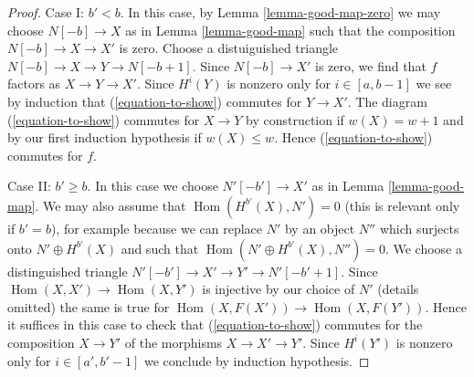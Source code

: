 \documentclass[10pt,a4paper]{amsart}
\theoremstyle{plain}
\theoremstyle{definition}
\theoremstyle{remark}
\numberwithin{equation}{subsection}
\def\Hom{\mathop{\mathrm{Hom}}\nolimits}
\begin{document}
\begin{proof}
\medskip\noindent
Case I: $b' < b$. In this case, by Lemma \ref{lemma-good-map-zero}
we may choose $N[-b] \to X$ as in Lemma \ref{lemma-good-map}
such that the composition $N[-b] \to X \to X'$ is zero.
Choose a distuiguished triangle $N[-b] \to X \to Y \to N[-b + 1]$. Since
$N[-b] \to X'$ is zero, we find that $f$ factors
as $X \to Y \to X'$. Since $H^i(Y)$ is nonzero only for $i \in [a, b - 1]$
we see by induction that (\ref{equation-to-show}) commutes for
$Y \to X'$. The diagram (\ref{equation-to-show}) commutes for
$X \to Y$ by construction if $w(X) = w + 1$ and by our first
induction hypothesis if $w(X) \leq w$.
Hence (\ref{equation-to-show}) commutes for $f$.

\medskip\noindent
Case II: $b' \geq b$. In this case we choose $N'[-b'] \to X'$
as in Lemma \ref{lemma-good-map}.
We may also assume that $\Hom(H^{b'}(X), N') = 0$ (this is
relevant only if $b' = b$), for example because we can
replace $N'$ by an object $N''$ which surjects onto $N' \oplus H^{b'}(X)$
and such that $\Hom(N' \oplus H^{b'}(X), N'') = 0$.
We choose a distinguished triangle
$N'[-b'] \to X' \to Y' \to N'[-b' + 1]$. Since
$\Hom(X, X') \to \Hom(X, Y')$ is injective by our choice of $N'$
(details omitted) the same is true for
$\Hom(X, F(X')) \to \Hom(X, F(Y'))$.
Hence it suffices in this case to check that
(\ref{equation-to-show}) commutes for the composition $X \to Y'$
of the morphisms $X \to X' \to Y'$.
Since $H^i(Y')$ is nonzero only for $i \in [a', b' - 1]$
we conclude by induction hypothesis.
\end{proof}



\end{document}
